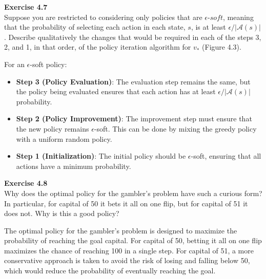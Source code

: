 \documentclass[addpoints]{exam}
\begin{document}
\begin{questions}
    \question
    \textbf{Exercise 4.7} \\ Suppose you are restricted to considering only policies that are \(\epsilon\)-\(soft\), meaning that the probability of selecting each action in each state, \(s\), is at least \(\epsilon/|\mathcal{A}(s)|\). Describe qualitatively the changes that would be required in each of the steps 3, 2, and 1, in that order, of the policy iteration algorithm for \(v_{*}\) (Figure 4.3).
    \begin{solution}
        For an \(\epsilon\)-soft policy:
        \begin{itemize}
            \item \textbf{Step 3 (Policy Evaluation)}: The evaluation step remains the same, but the policy being evaluated ensures that each action has at least \(\epsilon/|\mathcal{A}(s)|\) probability.
            \item \textbf{Step 2 (Policy Improvement)}: The improvement step must ensure that the new policy remains \(\epsilon\)-soft. This can be done by mixing the greedy policy with a uniform random policy.
            \item \textbf{Step 1 (Initialization)}: The initial policy should be \(\epsilon\)-soft, ensuring that all actions have a minimum probability.
        \end{itemize}
    \end{solution}

    \question
    \textbf{Exercise 4.8} \\ Why does the optimal policy for the gambler's problem have such a curious form? In particular, for capital of 50 it bets it all on one flip, but for capital of 51 it does not. Why is this a good policy?
    \begin{solution}
        The optimal policy for the gambler's problem is designed to maximize the probability of reaching the goal capital. For capital of 50, betting it all on one flip maximizes the chance of reaching 100 in a single step. For capital of 51, a more conservative approach is taken to avoid the risk of losing and falling below 50, which would reduce the probability of eventually reaching the goal.
    \end{solution}


\end{questions}
\end{document}
